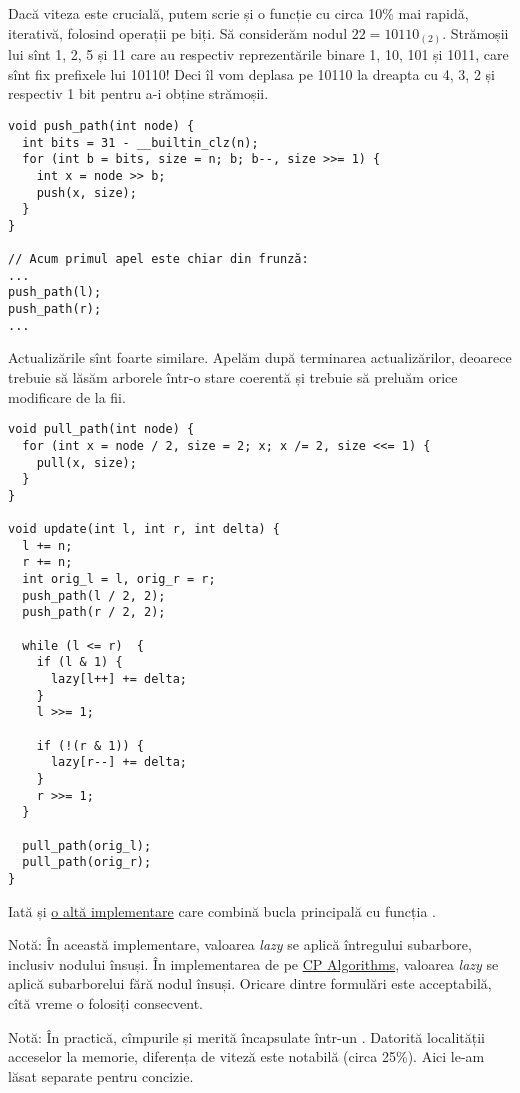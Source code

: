 Dacă viteza este crucială, putem scrie și o funcție  cu circa 10\% mai rapidă, iterativă, folosind operații pe biți. Să considerăm nodul $22=10110_{(2)}$. Strămoșii lui sînt 1, 2, 5 și 11 care au respectiv reprezentările binare 1, 10, 101 și 1011, care sînt fix prefixele lui 10110! Deci îl vom deplasa pe 10110 la dreapta cu 4, 3, 2 și respectiv 1 bit pentru a-i obține strămoșii.

\begin{verbatim}
void push_path(int node) {
  int bits = 31 - __builtin_clz(n);
  for (int b = bits, size = n; b; b--, size >>= 1) {
    int x = node >> b;
    push(x, size);
  }
}

// Acum primul apel este chiar din frunză:
...
push_path(l);
push_path(r);
...
\end{verbatim}

Actualizările sînt foarte similare. Apelăm  după terminarea actualizărilor, deoarece trebuie să lăsăm arborele într-o stare coerentă și trebuie să preluăm orice modificare de la fii.

\begin{verbatim}
void pull_path(int node) {
  for (int x = node / 2, size = 2; x; x /= 2, size <<= 1) {
    pull(x, size);
  }
}

void update(int l, int r, int delta) {
  l += n;
  r += n;
  int orig_l = l, orig_r = r;
  push_path(l / 2, 2);
  push_path(r / 2, 2);

  while (l <= r)  {
    if (l & 1) {
      lazy[l++] += delta;
    }
    l >>= 1;

    if (!(r & 1)) {
      lazy[r--] += delta;
    }
    r >>= 1;
  }

  pull_path(orig_l);
  pull_path(orig_r);
}
\end{verbatim}

Iată și \href{https://codeforces.com/blog/entry/18051}{o altă implementare} care combină bucla  principală cu funcția .

Notă: În această implementare, valoarea \textit{lazy} se aplică întregului subarbore, inclusiv nodului însuși. În implementarea de pe \href{https://cp-algorithms.com/data_structures/segment_tree.html#adding-on-segments-querying-for-maximum}{CP Algorithms}, valoarea \textit{lazy} se aplică subarborelui fără nodul însuși. Oricare dintre formulări este acceptabilă, cîtă vreme o folosiți consecvent.

Notă: În practică, cîmpurile  și  merită încapsulate într-un . Datorită localității acceselor la memorie, diferența de viteză este notabilă (circa 25\%). Aici le-am lăsat separate pentru concizie.
